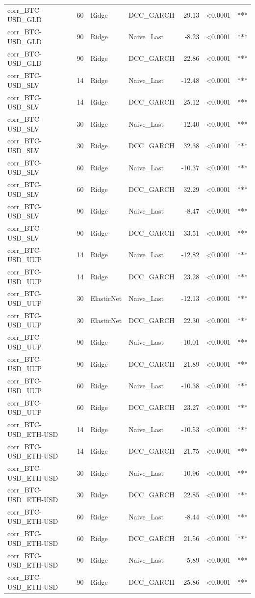 \begin{table}[H]
\begin{tabular}{llllrrl}
corr_BTC-USD_GLD & 60 & Ridge & DCC_GARCH & 29.13 & <0.0001 & *** \\
corr_BTC-USD_GLD & 90 & Ridge & Naive_Last & -8.23 & <0.0001 & *** \\
corr_BTC-USD_GLD & 90 & Ridge & DCC_GARCH & 22.86 & <0.0001 & *** \\
corr_BTC-USD_SLV & 14 & Ridge & Naive_Last & -12.48 & <0.0001 & *** \\
corr_BTC-USD_SLV & 14 & Ridge & DCC_GARCH & 25.12 & <0.0001 & *** \\
corr_BTC-USD_SLV & 30 & Ridge & Naive_Last & -12.40 & <0.0001 & *** \\
corr_BTC-USD_SLV & 30 & Ridge & DCC_GARCH & 32.38 & <0.0001 & *** \\
corr_BTC-USD_SLV & 60 & Ridge & Naive_Last & -10.37 & <0.0001 & *** \\
corr_BTC-USD_SLV & 60 & Ridge & DCC_GARCH & 32.29 & <0.0001 & *** \\
corr_BTC-USD_SLV & 90 & Ridge & Naive_Last & -8.47 & <0.0001 & *** \\
corr_BTC-USD_SLV & 90 & Ridge & DCC_GARCH & 33.51 & <0.0001 & *** \\
corr_BTC-USD_UUP & 14 & Ridge & Naive_Last & -12.82 & <0.0001 & *** \\
corr_BTC-USD_UUP & 14 & Ridge & DCC_GARCH & 23.28 & <0.0001 & *** \\
corr_BTC-USD_UUP & 30 & ElasticNet & Naive_Last & -12.13 & <0.0001 & *** \\
corr_BTC-USD_UUP & 30 & ElasticNet & DCC_GARCH & 22.30 & <0.0001 & *** \\
corr_BTC-USD_UUP & 90 & Ridge & Naive_Last & -10.01 & <0.0001 & *** \\
corr_BTC-USD_UUP & 90 & Ridge & DCC_GARCH & 21.89 & <0.0001 & *** \\
corr_BTC-USD_UUP & 60 & Ridge & Naive_Last & -10.38 & <0.0001 & *** \\
corr_BTC-USD_UUP & 60 & Ridge & DCC_GARCH & 23.27 & <0.0001 & *** \\
corr_BTC-USD_ETH-USD & 14 & Ridge & Naive_Last & -10.53 & <0.0001 & *** \\
corr_BTC-USD_ETH-USD & 14 & Ridge & DCC_GARCH & 21.75 & <0.0001 & *** \\
corr_BTC-USD_ETH-USD & 30 & Ridge & Naive_Last & -10.96 & <0.0001 & *** \\
corr_BTC-USD_ETH-USD & 30 & Ridge & DCC_GARCH & 22.85 & <0.0001 & *** \\
corr_BTC-USD_ETH-USD & 60 & Ridge & Naive_Last & -8.44 & <0.0001 & *** \\
corr_BTC-USD_ETH-USD & 60 & Ridge & DCC_GARCH & 21.56 & <0.0001 & *** \\
corr_BTC-USD_ETH-USD & 90 & Ridge & Naive_Last & -5.89 & <0.0001 & *** \\
corr_BTC-USD_ETH-USD & 90 & Ridge & DCC_GARCH & 25.86 & <0.0001 & *** \\
\bottomrule
\end{tabular}
\end{table}